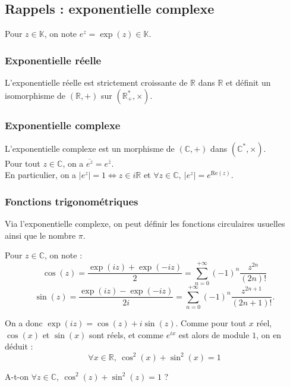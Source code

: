 \documentclass[french]{article}
\newcommand{\R}{\mathbb{R}}
\newcommand{\C}{\mathbb{C}}
\newcommand{\K}{\mathbb{K}}
\newcommand{\st}{^*}
\theoremstyle{plain}
\theoremstyle{definition}
\theoremstyle{remark}
\begin{document}
\subsection{Rappels : exponentielle complexe}

Pour $z\in\K$, on note $e^z=\exp(z)\in\K$.

\subsubsection*{Exponentielle réelle}

\begin{prop}%
	L'exponentielle réelle est strictement croissante de $\R$ dans $\R$ et définit un isomorphisme de $(\R,+)$ sur $(\R_+\st,\times)$.
\end{prop}

\subsubsection*{Exponentielle complexe}

\begin{prop}%
	L'exponentielle complexe est un morphisme de $(\C,+)$ dans $(\C\st,\times)$. \\
	Pour tout $z\in\C$, on a $\overline{e^z}=e^{\overline{z}}$. \\
	En particulier, on a $\lvert e^z\rvert=1\iff z\in i\R$ et $\forall z\in\C,\ \lvert e^z\rvert=e^{\text{Re}(z)}$.
\end{prop}

\subsubsection*{Fonctions trigonométriques}

Via l'exponentielle complexe, on peut définir les fonctions circulaires usuelles ainsi que le nombre $\pi$.

\begin{dfn}
	Pour $z\in\C$, on note : $$\cos(z)=\frac{\exp(iz)+\exp(-iz)}{2}=\sum_{n=0}^{+\infty}(-1)^n\frac{z^{2n}}{(2n)!}$$
	$$\sin(z)=\frac{\exp(iz)-\exp(-iz)}{2i}=\sum_{n=0}^{+\infty}(-1)^n\frac{z^{2n+1}}{(2n+1)!}.$$
\end{dfn}

On a donc $\exp(iz)=\cos(z)+i\sin(z)$. Comme pour tout $x$ réel, $\cos(x)$ et $\sin(x)$ sont réels, et comme $e^{ix}$ est alors de module $1$, on en déduit : $$\forall x\in\R,\ \cos^2(x)+\sin^2(x)=1$$

\begin{exo}
	A-t-on $\forall z\in\C,\ \cos^2(z)+\sin^2(z)=1$ ? %
\end{exo}
\end{document}
